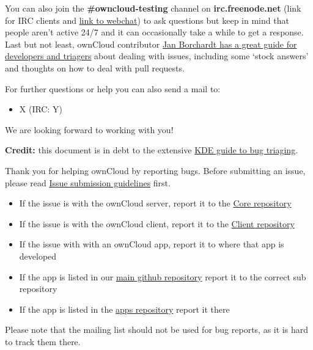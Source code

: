 \documentclass[letterpaper,10pt,english]{sphinxmanual}
\begin{document}
You can also join the \textbf{\#owncloud-testing} channel on \textbf{irc.freenode.net} (link for IRC clients and \href{https://webchat.freenode.net/}{link to webchat}) to ask questions but keep in mind that people aren't active 24/7 and it can occasionally take a while to get a response. Last but not least, ownCloud contributor \href{https://gist.github.com/jancborchardt/6155185}{Jan Borchardt has a great guide for developers and triagers} about dealing with issues, including some `stock answers' and thoughts on how to deal with pull requests.

For further questions or help you can also send a mail to:
\begin{itemize}
\item {} 
X (IRC: Y)

\end{itemize}

We are looking forward to working with you!

\textbf{Credit:} this document is in debt to the extensive \href{https://techbase.kde.org/Contribute/Bugsquad/Guide\_To\_BugTriaging}{KDE guide to bug triaging}.

Thank you for helping ownCloud by reporting bugs. Before submitting an issue, please read
\href{https://github.com/owncloud/core/blob/master/.github/CONTRIBUTING.md\#submitting-issues}{Issue submission guidelines} first.
\begin{itemize}
\item {} 
If the issue is with the ownCloud server, report it to the \href{https://github.com/owncloud/core/issues}{Core repository}

\item {} 
If the issue is with the ownCloud client, report it to the \href{https://github.com/owncloud/client/issues}{Client repository}

\item {} 
If the issue with with an ownCloud app, report it to where that app is developed

\item {} 
If the app is listed in our \href{https://github.com/owncloud}{main github repository} report it to the correct sub
repository

\item {} 
If the app is listed in the \href{https://github.com/owncloud/apps/issues}{apps repository} report it there

\end{itemize}

Please note that the mailing list should not be used for bug reports, as it is hard to track them there.
\end{document}
